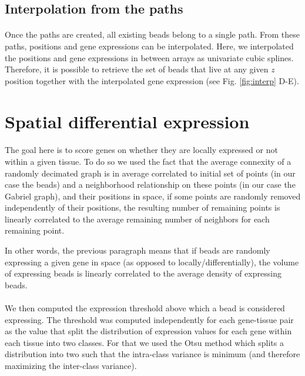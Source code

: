 \documentclass[10pt,a4paper]{article}
\begin{document}
\subsection{Interpolation from the paths}
\paragraph{}Once the paths are created, all existing beads belong to a single path.
From these paths, positions and gene expressions can be interpolated.
Here, we interpolated the positions and gene expressions in between arrays as univariate cubic splines. Therefore, it is possible to retrieve the set of beads that live at any given \(z\) position together with the interpolated gene expression (see Fig. \ref{fig:interp} D-E).
\section{Spatial differential expression}
\paragraph{}The goal here is to score genes on whether they are locally expressed or not within a given tissue.
To do so we used the fact that the average connexity of a randomly decimated graph is in average correlated to 
 initial set of points (in our case the beads) and a neighborhood relationship on these points (in our case the Gabriel graph),
and their positions in space, if some points are randomly removed independently of their positions, the resulting number of remaining points is linearly correlated to the average remaining number of neighbors for each remaining point.

In other words, the previous paragraph means that if beads are randomly expressing a given gene in space (as opposed to locally/differentially), the volume of expressing beads is linearly correlated to the average density of expressing beads.
\paragraph{}We then computed the expression threshold above which a bead is considered expressing.
The threshold was computed independently for each gene-tissue pair as the value that split the distribution of expression values for each gene within each tissue into two classes. For that we used the Otsu method \citep{Otsu:1979} which splits a distribution into two such that the intra-class variance is minimum (and therefore maximizing the inter-class variance).
\end{document}
